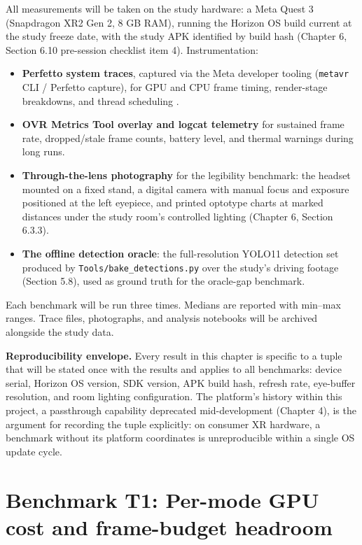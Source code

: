 All measurements will be taken on the study hardware: a Meta Quest 3 (Snapdragon XR2 Gen 2, 8 GB
RAM), running the Horizon OS build current at the study freeze date, with the study APK identified
by build hash (Chapter 6, Section 6.10 pre-session checklist item 4). Instrumentation:

\begin{itemize}
\item \textbf{Perfetto system traces}, captured via the Meta developer tooling (\verb|metavr| CLI / Perfetto
  capture), for GPU and CPU frame timing, render-stage breakdowns, and thread scheduling
  \citep{meta2025a}.
\item \textbf{OVR Metrics Tool overlay and logcat telemetry} \citep{meta2025b} for sustained frame rate,
  dropped/stale frame counts, battery level, and thermal warnings during long runs.
\item \textbf{Through-the-lens photography} for the legibility benchmark: the headset mounted on a fixed
  stand, a digital camera with manual focus and exposure positioned at the left eyepiece, and
  printed optotype charts at marked distances under the study room's controlled lighting
  (Chapter 6, Section 6.3.3).
\item \textbf{The offline detection oracle}: the full-resolution YOLO11 detection set produced by
  \verb|Tools/bake_detections.py| over the study's driving footage (Section 5.8), used as ground truth
  for the oracle-gap benchmark.
\end{itemize}

Each benchmark will be run three times. Medians are reported with min–max ranges. Trace files,
photographs, and analysis notebooks will be archived alongside the study data.

\textbf{Reproducibility envelope.} Every result in this chapter is specific to a tuple that will be
stated once with the results and applies to all benchmarks: device serial, Horizon OS version,
SDK version, APK build hash, refresh rate, eye-buffer resolution, and room lighting configuration.
The platform's history within this project, a passthrough capability deprecated mid-development
(Chapter 4), is the argument for recording the tuple explicitly: on consumer XR hardware, a
benchmark without its platform coordinates is unreproducible within a single OS update cycle.

\section{Benchmark T1: Per-mode GPU cost and frame-budget headroom}

